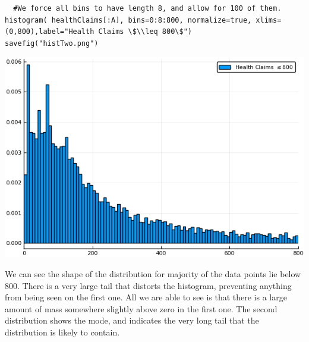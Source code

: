 \documentclass[12pt, letterpaper]{paper}
\begin{document}
\begin{verbatim}
  #We force all bins to have length 8, and allow for 100 of them.
histogram( healthClaims[:A], bins=0:8:800, normalize=true, xlims=(0,800),label="Health Claims \$\\leq 800\$")
savefig("histTwo.png")

\end{verbatim}

\begin{center}
\includegraphics[width=.9\linewidth]{histTwo.png}
\end{center}

We can see the shape of the distribution for majority of the data
points lie below \(800\). There is a very large tail that distorts the
histogram, preventing anything from being seen on the first one. All
we are able to see is that there is a large amount of mass somewhere
slightly above zero in the first one. The second distribution shows
the mode, and indicates the very long tail that the distribution is
likely to contain.
\end{document}
